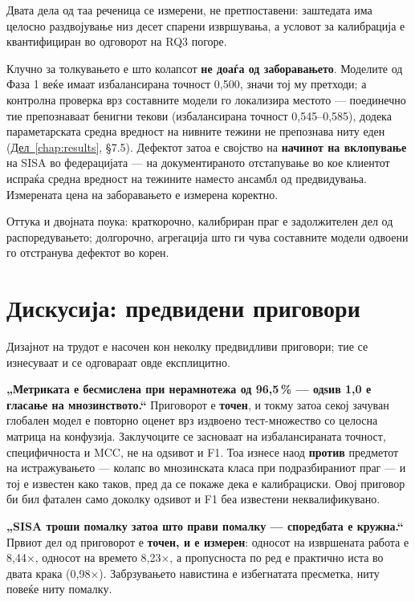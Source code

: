 Двата дела од таа реченица се измерени, не претпоставени: заштедата има целосно раздвојување
низ десет спарени извршувања, а условот за калибрација е квантифициран во одговорот на RQ3
погоре.

Клучно за толкувањето е што колапсот \textbf{не доаѓа од заборавањето}. Моделите од Фаза 1 веќе
имаат избалансирана точност 0,500, значи тој му претходи; а контролна проверка врз составните
модели го локализира местото --- поединечно тие препознаваат бенигни текови (избалансирана
точност 0,545–0,585), додека параметарската средна вредност на нивните тежини не препознава
ниту еден (\hyperref[chap:results]{Дел~\ref*{chap:results}}, §7.5). Дефектот затоа е својство на \textbf{начинот на вклопување} на
SISA во федерацијата --- на документираното отстапување во кое клиентот испраќа средна вредност
на тежините наместо ансамбл од предвидувања. Измерената цена на заборавањето е измерена
коректно.

Оттука и двојната поука: краткорочно, калибриран праг е задолжителен дел од распоредувањето;
долгорочно, агрегација што ги чува составните модели одвоени го отстранува дефектот во
корен.

\section{Дискусија: предвидени приговори}

Дизајнот на трудот е насочен кон неколку предвидливи приговори; тие се изнесуваат и се
одговараат овде експлицитно.

\textbf{„Метриката е бесмислена при нерамнотежа од 96,5\,\% --- одѕив 1,0 е гласање на мнозинството.“}
Приговорот е \textbf{точен}, и токму затоа секој зачуван глобален модел е повторно оценет врз
издвоено тест-множество со целосна матрица на конфузија. Заклучоците се засноваат на
избалансираната точност, специфичноста и MCC, не на одѕивот и F1. Тоа изнесе наод \textbf{против}
предметот на истражувањето --- колапс во мнозинската класа при подразбираниот праг --- и тој е
известен како таков, пред да се покаже дека е калибрациски. Овој приговор би бил фатален само
доколку одѕивот и F1 беа известени неквалификувано.

\textbf{„SISA троши помалку затоа што прави помалку --- споредбата е кружна.“} Првиот дел од
приговорот е \textbf{точен, и е измерен}: односот на извршената работа е 8,44×, односот на времето
8,23×, а пропусноста по ред е практично иста во двата крака (0,98×). Забрзувањето навистина е
избегнатата пресметка, ниту повеќе ниту помалку.

